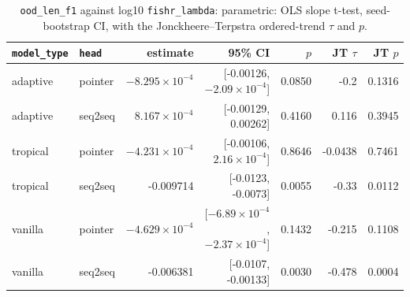 \documentclass[10pt]{article}
\begin{document}
{\small
\begin{longtable}{llrrrrr}
\caption{\texttt{ood\_len\_f1} against log10 \texttt{fishr\_lambda}: parametric: OLS slope t-test, seed-bootstrap CI, with the Jonckheere--Terpstra ordered-trend $\tau$ and $p$.}\label{tab:trend-ood_len_f1}\\
\toprule
\texttt{model\_type} & \texttt{head} & estimate & 95\% CI & $p$ & JT $\tau$ & JT $p$\\
\midrule
\endhead
adaptive & pointer & $-8.295\times10^{-4}$ & [-0.00126, $-2.09\times10^{-4}$] & 0.0850 & -0.2 & 0.1316\\
adaptive & seq2seq & $8.167\times10^{-4}$ & [-0.00129, 0.00262] & 0.4160 & 0.116 & 0.3945\\
tropical & pointer & $-4.231\times10^{-4}$ & [-0.00106, $2.16\times10^{-4}$] & 0.8646 & -0.0438 & 0.7461\\
tropical & seq2seq & -0.009714 & [-0.0123, -0.0073] & 0.0055 & -0.33 & 0.0112\\
vanilla & pointer & $-4.629\times10^{-4}$ & [$-6.89\times10^{-4}$, $-2.37\times10^{-4}$] & 0.1432 & -0.215 & 0.1108\\
vanilla & seq2seq & -0.006381 & [-0.0107, -0.00133] & 0.0030 & -0.478 & 0.0004\\
\bottomrule
\end{longtable}
}
\end{document}

